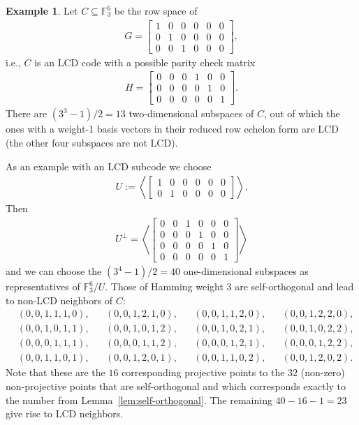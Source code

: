 \documentclass[11pt]{article}
\theoremstyle{definition}
\newtheorem{example}[theorem]{Example}
\newcommand{\F}{\mathbb{F}}
\newcommand{\Ang}[1]{\left\langle#1\right\rangle}
\begin{document}
\begin{example}
	Let $C\subseteq \F_3^6$ be the row space of
	\begin{align*}
		G = \begin{bmatrix}
			1 & 0 & 0 & 0 & 0 & 0 \\
			0 & 1 & 0 & 0 & 0 & 0 \\
			0 & 0 & 1 & 0 & 0 & 0
		\end{bmatrix},
	\end{align*}
	i.e., $C$ is an LCD code with a possible parity check matrix 
	\begin{align*}
		H = \begin{bmatrix}
			0 & 0 & 0 & 1 & 0 & 0 \\
			0 & 0 & 0 & 0 & 1 & 0 \\
			0 & 0 & 0 & 0 & 0 & 1
		\end{bmatrix}.
	\end{align*}
	There are $(3^3 - 1) / 2 = 13$ two-dimensional subspaces of $C$, out of which the ones with a weight-1 basis vectors in their reduced row echelon form are LCD (the other four subspaces are not LCD).

	As an example with an LCD subcode we choose 
	\begin{align*}
		U := \Ang{\begin{bmatrix}
			1 & 0 & 0 & 0 & 0 & 0\\
			0 & 1 & 0 & 0 & 0 & 0
		\end{bmatrix}}.
	\end{align*}
	Then 
	\begin{align*}
		U^\perp= \Ang{\begin{bmatrix}
			0 & 0 & 1 & 0 & 0 & 0\\
			0 & 0 & 0 & 1 & 0 & 0\\
			0 & 0 & 0 & 0 & 1 & 0\\
			0 & 0 & 0 & 0 & 0 & 1
		\end{bmatrix}}
	\end{align*}
	and we can choose the $(3^4 - 1) / 2 = 40$ one-dimensional subspaces as representatives of $\F_3^6/U$.
	Those of Hamming weight $3$ are self-orthogonal and lead to non-LCD neighbors of $C$:
	\begin{align*}
		&(0,0,1,1,1,0), &&(0,0,1,2,1,0), &&(0,0,1,1,2,0), &&(0,0,1,2,2,0), \\
		&(0,0,1,0,1,1), &&(0,0,1,0,1,2), &&(0,0,1,0,2,1), &&(0,0,1,0,2,2), \\
		&(0,0,0,1,1,1), &&(0,0,0,1,1,2), &&(0,0,0,1,2,1), &&(0,0,0,1,2,2), \\
		&(0,0,1,1,0,1), &&(0,0,1,2,0,1), &&(0,0,1,1,0,2), &&(0,0,1,2,0,2).
	\end{align*}
	Note that these are the $16$ corresponding projective points to the $32$ (non-zero) non-projective points that are self-orthogonal and which corresponds exactly to the number from Lemma~\ref{lem:self-orthogonal}.
	The remaining $40 - 16 - 1 = 23$ give rise to LCD neighbors.
	

\end{example}
\end{document}
